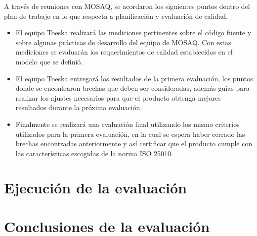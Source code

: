 A través de reuniones con MOSAQ, se acordaron los siguientes puntos dentro del plan de trabajo en lo 
que respecta a planificación y evaluación de calidad.
\begin{itemize}
\item El equipo Toeska realizará las mediciones pertinentes sobre el código fuente y sobre algunas 
prácticas de desarrollo del equipo de MOSAQ. Con estas mediciones se evaluarán los requerimientos de 
calidad establecidos en el modelo que se definió.


\item El equipo Toeska entregará los resultados de la primera evaluación, los puntos donde se encontraron 
brechas que deben ser consideradas, además guías para realizar los ajustes necesarios para que el producto 
obtenga mejores resultados durante la próxima evaluación.

\item Finalmente se realizará una evaluación final utilizando los mismo criterios utilizados 
para la primera evaluación, en la cual se espera haber cerrado las brechas encontradas anteriormente 
y así certificar que el producto cumple con las características escogidas de la norma ISO 25010.
\end{itemize}
\section{Ejecución de la evaluación}
\section{Conclusiones de la evaluación}
